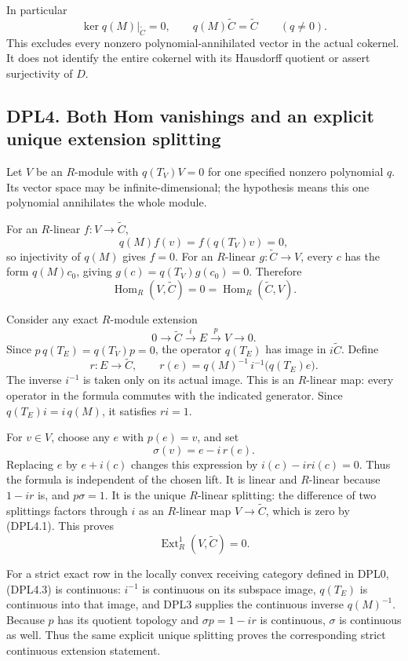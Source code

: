 In particular \[
\ker q(M)|_{\widetilde C}=0,\qquad
q(M)\widetilde C=\widetilde C\qquad(q\ne0).
\tag{DPL3.5}
\] This excludes every nonzero polynomial-annihilated vector in the
actual cokernel. It does not identify the entire cokernel with its
Hausdorff quotient or assert surjectivity of \(D\).

\subsection{DPL4. Both Hom vanishings and an explicit unique extension
splitting}\label{dpl4.-both-hom-vanishings-and-an-explicit-unique-extension-splitting}

Let \(V\) be an \(R\)-module with \(q(T_V)V=0\) for one specified
nonzero polynomial \(q\). Its vector space may be infinite-dimensional;
the hypothesis means this one polynomial annihilates the whole module.

For an \(R\)-linear \(f:V\to\widetilde C\), \[
q(M)f(v)=f(q(T_V)v)=0,
\] so injectivity of \(q(M)\) gives \(f=0\). For an \(R\)-linear
\(g:\widetilde C\to V\), every \(c\) has the form \(q(M)c_0\), giving
\(g(c)=q(T_V)g(c_0)=0\). Therefore \[
\boxed{\operatorname{Hom}_R(V,\widetilde C)=0
=\operatorname{Hom}_R(\widetilde C,V).}
\tag{DPL4.1}
\]

Consider any exact \(R\)-module extension \[
0\longrightarrow\widetilde C\xrightarrow{i}E
\xrightarrow{p}V\longrightarrow0.
\tag{DPL4.2}
\] Since \(p\,q(T_E)=q(T_V)p=0\), the operator \(q(T_E)\) has image in
\(i\widetilde C\). Define \[
r:E\to\widetilde C,\qquad
r(e)=q(M)^{-1}\,i^{-1}\bigl(q(T_E)e\bigr).
\tag{DPL4.3}
\] The inverse \(i^{-1}\) is taken only on its actual image. This is an
\(R\)-linear map: every operator in the formula commutes with the
indicated generator. Since \(q(T_E)i=i\,q(M)\), it satisfies \(ri=1\).

For \(v\in V\), choose any \(e\) with \(p(e)=v\), and set \[
\boxed{\sigma(v)=e-i\,r(e).}
\tag{DPL4.4}
\] Replacing \(e\) by \(e+i(c)\) changes this expression by
\(i(c)-ir i(c)=0\). Thus the formula is independent of the chosen lift.
It is linear and \(R\)-linear because \(1-ir\) is, and \(p\sigma=1\). It
is the unique \(R\)-linear splitting: the difference of two splittings
factors through \(i\) as an \(R\)-linear map \(V\to\widetilde C\), which
is zero by (DPL4.1). This proves \[
\boxed{\operatorname{Ext}^1_R(V,\widetilde C)=0.}
\tag{DPL4.5}
\]

For a strict exact row in the locally convex receiving category defined
in DPL0, (DPL4.3) is continuous: \(i^{-1}\) is continuous on its
subspace image, \(q(T_E)\) is continuous into that image, and DPL3
supplies the continuous inverse \(q(M)^{-1}\). Because \(p\) has its
quotient topology and \(\sigma p=1-ir\) is continuous, \(\sigma\) is
continuous as well. Thus the same explicit unique splitting proves the
corresponding strict continuous extension statement.

